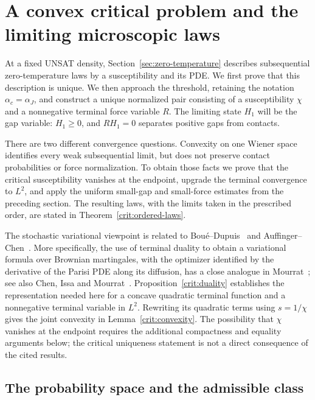\documentclass[11pt,a4paper]{article}
\numberwithin{equation}{section}
\theoremstyle{definition}
\theoremstyle{remark}
\begin{document}
\section{A convex critical problem and the limiting microscopic laws}
\label{sec:critical}

At a fixed UNSAT density, Section~\ref{sec:zero-temperature} describes
subsequential zero-temperature laws by a susceptibility and its PDE.
We first prove that this description is unique. We then approach the
threshold, retaining the notation $\alpha_c=\alpha_J$, and construct a
unique normalized pair consisting of a susceptibility $\chi$ and a
nonnegative terminal force variable $R$. The limiting state $H_1$ will
be the gap variable: $H_1\ge0$, and $RH_1=0$ separates positive gaps
from contacts.

There are two different convergence questions. Convexity on one Wiener
space identifies every weak subsequential limit, but does not preserve
contact probabilities or force normalization. To obtain those facts we
prove that the critical susceptibility vanishes at the endpoint, upgrade
the terminal convergence to $L^2$, and apply the uniform small-gap and
small-force estimates from the preceding section. The resulting laws,
with the limits taken in the prescribed order, are stated in
Theorem~\ref{crit:ordered-laws}.

The stochastic variational viewpoint is related to
Bou\'e--Dupuis~\cite{BoueDupuis1998} and
Auffinger--Chen~\cite{AuffingerChen2015}.  More specifically, the use of
terminal duality to obtain a variational formula over Brownian martingales,
with the optimizer identified by the derivative of the Parisi PDE along
its diffusion, has a close analogue in Mourrat~\cite[Lemma~2.2 and
Theorem~2 in the preprint]{MourratUninverting2025}; see also Chen, Issa and
Mourrat~\cite[Proposition~8.1 and Theorem~1.5]{ChenIssaMourrat2025}.
Proposition~\ref{crit:duality} establishes the representation needed here
for a concave quadratic terminal function and a nonnegative terminal
variable in $L^2$.  Rewriting its quadratic terms using $s=1/\chi$ gives
the joint convexity in Lemma~\ref{crit:convexity}.  The possibility that
$\chi$ vanishes at the endpoint requires the additional compactness and
equality arguments below; the critical uniqueness statement is not a
direct consequence of the cited results.

\subsection{The probability space and the admissible class}
\end{document}
